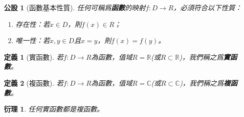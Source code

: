 \documentclass[12pt]{article}
\newtheorem{definition}{定義}
\newtheorem*{corollary}{衍理}
\newtheorem*{axiom}{公設}
\begin{document}
    \begin{axiom}[函數基本性質]
        任何可稱爲\textbf{函數}的映射$f:D\to R$，必須符合以下性質：\begin{enumerate}
            \item 存在性：若$x\in D$，則$f(x)\in R$；
            \item 唯一性：若$x,y\in D$且$x=y$，則$f(x)=f(y)$。
        \end{enumerate}
    \end{axiom}

    \begin{definition}[實函數]
        若$f:D\to R$為函數，值域$R=\mathbb{R}$(或$R\subset \mathbb{R}$)，我們稱之爲\textbf{實函數}。
    \end{definition}

    \begin{definition}[複函數]
        若$f:D\to R$為函數，值域$R=\mathbb{C}$(或$R\subset \mathbb{C}$)，我們稱之爲\textbf{複函數}。
    \end{definition}

    \begin{corollary}
        任何實函數都是複函數。
    \end{corollary}
\end{document}
